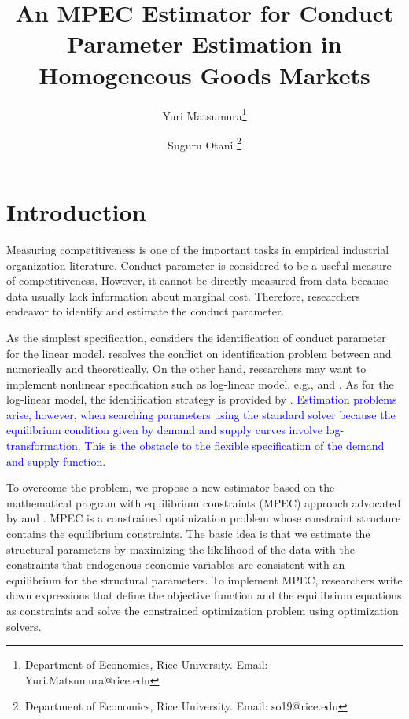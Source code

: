\documentclass[11pt, a4paper]{article}
\title{An MPEC Estimator for Conduct Parameter Estimation in Homogeneous Goods Markets}
\author{Yuri Matsumura\thanks{Department of Economics, Rice University. Email: Yuri.Matsumura@rice.edu} \and Suguru Otani \thanks{Department of Economics, Rice University. Email: so19@rice.edu
}}
\begin{document}
\maketitle
\begin{abstract}
\end{abstract}


\section{Introduction}
Measuring competitiveness is one of the important tasks in empirical industrial organization literature.
Conduct parameter is considered to be a useful measure of competitiveness. 
However, it cannot be directly measured from data because data usually lack information about marginal cost.
Therefore, researchers endeavor to identify and estimate the conduct parameter.

As the simplest specification, \citet{bresnahan1982oligopoly} considers the identification of conduct parameter for the linear model. \cite{matsumura2023revisiting} resolves the conflict on identification problem between \cite{bresnahan1982oligopoly} and \cite{perloff2012collinearity} numerically and theoretically. On the other hand, researchers may want to implement nonlinear specification such as log-linear model, e.g., \cite{okazaki2022excess} and \cite{merel2009measuring}. As for the log-linear model, the identification strategy is provided by \citet{lau1982identifying}. 
\textcolor{blue}{Estimation problems arise, however, when searching parameters using the standard solver because the equilibrium condition given by demand and supply curves involve log-transformation. This is the obstacle to the flexible specification of the demand and supply function.}


To overcome the problem, we propose a new estimator based on the mathematical program with equilibrium constraints (MPEC) approach advocated by \cite{su2012constrained} and \cite{dube2012improving}. MPEC is a constrained optimization problem whose constraint structure contains the equilibrium constraints. The basic idea is that we estimate the structural parameters by maximizing the likelihood of the data with the constraints that endogenous economic variables are consistent with an equilibrium for the structural parameters. To implement MPEC, researchers write down expressions that define the objective function and the equilibrium equations as constraints and solve the constrained optimization problem using optimization solvers. 
\end{document}
